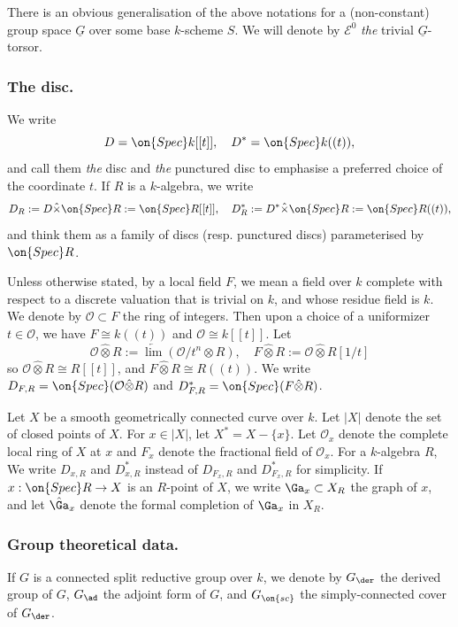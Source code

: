 \documentclass[]{pcmi}
\theoremstyle{plain}
\theoremstyle{remark}
\theoremstyle{definition}
\newcommand{\mE}{{\mathcal E}}
\newcommand{\mO}{{\mathcal O}}
\newcommand{\s}{{\on{sc}}}
\newcommand{\Spec}{\on{Spec}}
\begin{document}
There is an obvious generalisation of the above notations for a (non-constant) group space $\underline G$ over some base $k$-scheme $S$. We will denote by $\mE^0$ \emph{the} trivial $\underline G$-torsor.



\subsubsection{The disc.}\label{Intro:disc}
We write 
$$D=\Spec k[[t]],\quad D^*=\Spec k((t)),$$ and call them \emph{the} disc and \emph{the} punctured disc to emphasise a preferred choice of the coordinate $t$. If $R$ is a $k$-algebra, we write 
$$D_R: = D\hat\times\Spec R:=\Spec R[[t]], \quad D_R^*:= D^*\hat\times \Spec R:= \Spec R((t)),$$
and think them as a family of discs (resp. punctured discs) parameterised by $\Spec R$.


Unless otherwise stated, by a local field $F$, we mean a field over $k$ complete with respect to a discrete valuation that is trivial on $k$, and whose residue field is $k$. We denote by $\mO\subset F$ the ring of integers. 
Then upon a choice of  a uniformizer $t\in \mO$, we have $F\cong k((t))$ and $\mO\cong k[[t]]$.
Let
$$\mO\hat\otimes R:=\underleftarrow\lim (\mO/t^n\otimes R), \quad F\hat\otimes R:=\mO\hat\otimes R[1/t]$$ so $\mO\hat\otimes R\cong R[[t]]$, and $F\hat\otimes R\cong R((t))$.
We write $D_{F,R}=\Spec (\mO\hat\otimes R)$ and $D^*_{F,R}=\Spec (F\hat\otimes R)$.


Let $X$ be a smooth geometrically connected curve over $k$. Let $|X|$ denote the set of closed points of $X$. For $x\in |X|$, let $X^*= X-\{x\}$. 
Let $\mO_x$ denote the complete local ring of $X$ at $x$ and $F_x$ denote the fractional field of $\mO_x$. For a $k$-algebra $R$, We write $D_{x,R}$ and $D^*_{x,R}$ instead of $D_{F_x,R}$ and $D^*_{F_x,R}$ for simplicity.
If $x:\Spec R\to X$ is an $R$-point of $X$, we write $\Ga_x\subset X_R$ the graph of $x$, and let $\hat{\Ga}_x$ denote the formal completion of $\Ga_x$ in $X_R$.



\subsubsection{Group theoretical data.}\label{Intro:group}



If $G$ is a connected split reductive group over $k$, 
we denote by $G_\der$ the derived group of $G$, $G_\ad$ the adjoint form of $G$, and $G_\s$ the simply-connected cover of $G_\der$. 
\end{document}
